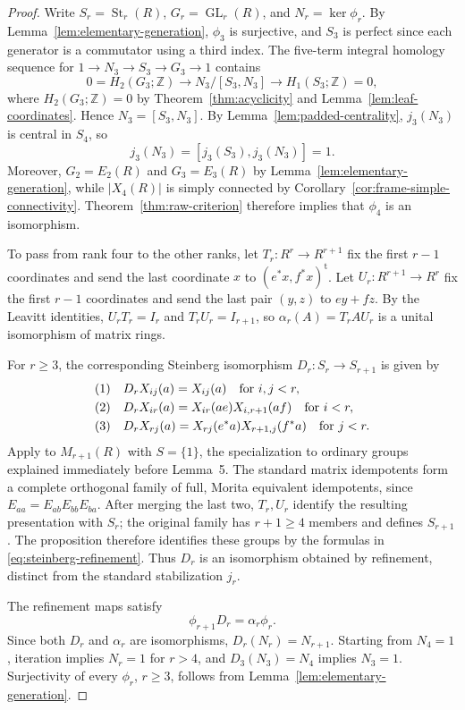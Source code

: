 \documentclass[11pt]{amsart}
\newcommand{\Z}{\mathbb Z}
\DeclareMathOperator{\GL}{GL}
\DeclareMathOperator{\St}{St}
\theoremstyle{definition}
\theoremstyle{remark}
\numberwithin{equation}{section}
\newcommand{\eqrownum}[1][]{%
  \hbox{\refstepcounter{equation}%
    \if\relax\detokenize{#1}\relax\else\label{#1}\fi
    \normalfont(\theequation)}}
\begin{document}
\begin{proof}
Write $S_r=\St_r(R)$, $G_r=\GL_r(R)$, and $N_r=\ker\phi_r$. By Lemma~\ref{lem:elementary-generation}, $\phi_3$ is surjective, and $S_3$ is perfect since each generator is a commutator using a third index. The five-term integral homology sequence for $1\to N_3\to S_3\to G_3\to1$ contains
$$
0=H_2(G_3;\Z)\longrightarrow N_3/[S_3,N_3] \longrightarrow H_1(S_3;\Z)=0,
$$
where $H_2(G_3;\Z)=0$ by Theorem~\ref{thm:acyclicity} and Lemma~\ref{lem:leaf-coordinates}. Hence $N_3=[S_3,N_3]$. By Lemma~\ref{lem:padded-centrality}, $j_3(N_3)$ is central in $S_4$, so
$$
j_3(N_3)=[j_3(S_3),j_3(N_3)]=1.
$$
Moreover, $G_2=E_2(R)$ and $G_3=E_3(R)$ by Lemma~\ref{lem:elementary-generation}, while $|X_4(R)|$ is simply connected by Corollary~\ref{cor:frame-simple-connectivity}. Theorem~\ref{thm:raw-criterion} therefore implies that $\phi_4$ is an isomorphism.

To pass from rank four to the other ranks, let $T_r:R^r\to R^{r+1}$ fix the first $r-1$ coordinates and send the last coordinate $x$ to $(e^*x,f^*x)^{\mathrm t}$. Let $U_r:R^{r+1}\to R^r$ fix the first $r-1$ coordinates and send the last pair $(y,z)$ to $ey+fz$. By the Leavitt identities, $U_rT_r=I_r$ and $T_rU_r=I_{r+1}$, so $\alpha_r(A)=T_rAU_r$ is a unital isomorphism of matrix rings.

For $r\geq3$, the corresponding Steinberg isomorphism $D_r:S_r\to S_{r+1}$ is given by
$$
\begin{aligned}
\eqrownum &\quad D_rX_{ij}(a)=X_{ij}(a) \quad \text{for }i,j<r,\\
\eqrownum &\quad D_rX_{ir}(a)=X_{ir}(ae)X_{i,r+1}(af) \quad \text{for }i<r,\\
\eqrownum[eq:steinberg-refinement] &\quad D_rX_{rj}(a)=X_{rj}(e^*a)X_{r+1,j}(f^*a) \quad \text{for }j<r.
\end{aligned}
$$
Apply \cite[\S4, Proposition~1]{Voronetsky20} to $M_{r+1}(R)$ with $S=\{1\}$, the specialization to ordinary groups explained immediately before Lemma~5. The standard matrix idempotents form a complete orthogonal family of full, Morita equivalent idempotents, since $E_{aa}=E_{ab}E_{bb}E_{ba}$. After merging the last two, $T_r,U_r$ identify the resulting presentation with $S_r$; the original family has $r+1\geq4$ members and defines $S_{r+1}$. The proposition therefore identifies these groups by the formulas in \eqref{eq:steinberg-refinement}. Thus $D_r$ is an isomorphism obtained by refinement, distinct from the standard stabilization $j_r$.

The refinement maps satisfy
$$
\phi_{r+1}D_r=\alpha_r\phi_r.
$$
Since both $D_r$ and $\alpha_r$ are isomorphisms, $D_r(N_r)=N_{r+1}$. Starting from $N_4=1$, iteration implies $N_r=1$ for $r>4$, and $D_3(N_3)=N_4$ implies $N_3=1$. Surjectivity of every $\phi_r$, $r\geq3$, follows from Lemma~\ref{lem:elementary-generation}.
\end{proof}
\end{document}
